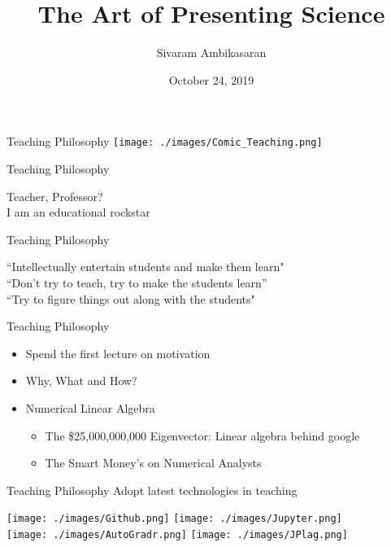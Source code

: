 \documentclass{beamer}
\title[\color{white}The Art of Presenting Science]{The Art of Presenting Science}
\date[\color{white}October 24, 2019]{October 24, 2019}
\author[\color{white}Sivaram Ambikasaran]{Sivaram Ambikasaran}
\institute[\color{white}IITM]{IITM}
\begin{document}
\frame{\titlepage}


\begin{frame}{Teaching Philosophy}
	\texttt{[image: ./images/Comic\_Teaching.png]}
\end{frame}

\begin{frame}[c]{Teaching Philosophy}
	\begin{center}
	\Huge{Teacher, Professor?}\\
	\pause
	\vspace{2em}
	\Huge{I am an {\color{cyan}educational} {\color{magenta}rockstar}}
	\end{center}
\end{frame}

\begin{frame}[c]{Teaching Philosophy}
	\LARGE
	\begin{center}
		``Intellectually entertain students and make them learn"\\
	\vspace{1em}
	``Don’t try to teach, try to make the students learn”\\
	\vspace{1em}
	``Try to figure things out along with the students"
	\end{center}
\end{frame}

\begin{frame}[c]{Teaching Philosophy}
	\LARGE
	\begin{itemize}
		\item
		Spend the first lecture on motivation
		\item
		Why, What and How?
		\item
		Numerical Linear Algebra
		\begin{itemize}
			\item
			The \$25,000,000,000 Eigenvector: Linear algebra behind google
			\item
			The Smart Money’s on Numerical Analysts
		\end{itemize}
	\end{itemize}
\end{frame}

\begin{frame}[c]{Teaching Philosophy}
	\LARGE
	Adopt latest technologies in teaching
	\begin{center}
	\texttt{[image: ./images/Github.png]} \hspace{1em}
	\texttt{[image: ./images/Jupyter.png]}\\
	\vspace{1em}
	\texttt{[image: ./images/AutoGradr.png]} \hspace{1em}
	\texttt{[image: ./images/JPlag.png]}
	\end{center}
\end{frame}
\end{document}
